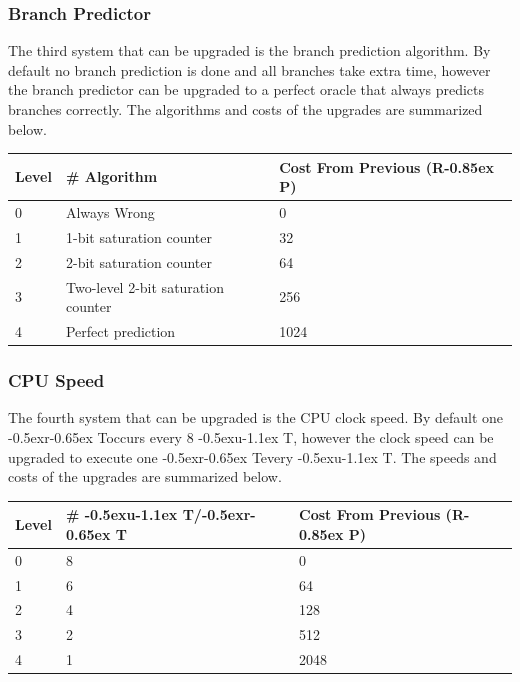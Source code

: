 \documentclass{article}
\newcommand{\UT}{\lower-0.5ex\hbox{u}\kern-1.1ex T}
\newcommand{\RT}{\lower-0.5ex\hbox{r}\kern-0.65ex T}
\newcommand{\RP}{R\kern-0.85ex P}
\begin{document}
\subsubsection{Branch Predictor}

The third system that can be upgraded is the branch prediction algorithm. By
default no branch prediction is done and all branches take extra time, however
the branch predictor can be upgraded to a perfect oracle that always predicts
branches correctly. The algorithms and costs of the upgrades are summarized
below.

\begin{minipage}{\textwidth}
\centering
\begin{tabular}{lll}
    \hline Level & \# Algorithm & Cost From Previous (\RP) \\ \hline
    0 & Always Wrong & 0 \\
    1 & 1-bit saturation counter & 32 \\
    2 & 2-bit saturation counter & 64 \\
    3 & Two-level 2-bit saturation counter & 256 \\
    4 & Perfect prediction & 1024 \\
\end{tabular}
\end{minipage}

\subsubsection{CPU Speed}

The fourth system that can be upgraded is the CPU clock speed. By default one
\RT occurs every 8 \UT, however the clock speed can be upgraded to execute one
\RT every \UT. The speeds and costs of the upgrades are summarized below.

\begin{minipage}{\textwidth}
\centering
\begin{tabular}{lll}
    \hline Level & \# \UT/\RT & Cost From Previous (\RP) \\ \hline
    0 & 8 & 0 \\
    1 & 6 & 64 \\
    2 & 4 & 128 \\
    3 & 2 & 512 \\
    4 & 1 & 2048 \\
\end{tabular}
\end{minipage}
\end{document}
